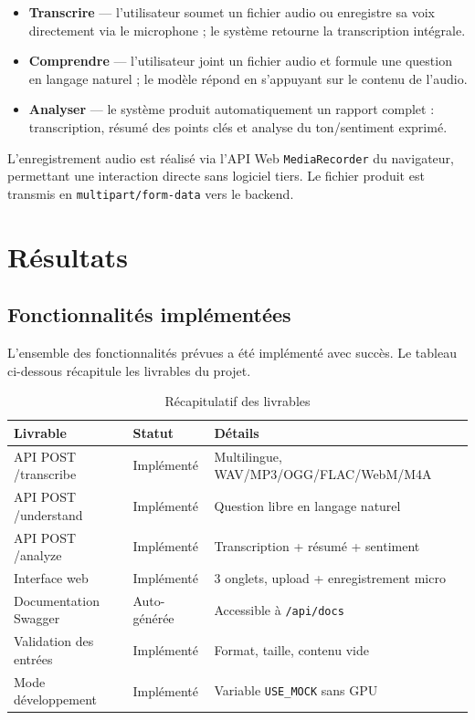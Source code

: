 \documentclass[12pt,a4paper]{report}
\begin{document}
\begin{itemize}
  \item \textbf{Transcrire} --- l'utilisateur soumet un fichier audio ou enregistre sa
        voix directement via le microphone ; le système retourne la transcription intégrale.

  \item \textbf{Comprendre} --- l'utilisateur joint un fichier audio et formule une
        question en langage naturel ; le modèle répond en s'appuyant sur le contenu de
        l'audio.

  \item \textbf{Analyser} --- le système produit automatiquement un rapport complet :
        transcription, résumé des points clés et analyse du ton/sentiment exprimé.
\end{itemize}

L'enregistrement audio est réalisé via l'API Web \texttt{MediaRecorder} du navigateur,
permettant une interaction directe sans logiciel tiers. Le fichier produit est transmis
en \texttt{multipart/form-data} vers le backend.

\chapter{Résultats}

\section{Fonctionnalités implémentées}

L'ensemble des fonctionnalités prévues a été implémenté avec succès. Le tableau
ci-dessous récapitule les livrables du projet.

\begin{table}[h]
\centering
{}
\begin{tabularx}{\textwidth}{llX}
\toprule
\textbf{Livrable} & \textbf{Statut} & \textbf{Détails} \\
\midrule
API POST /transcribe    & Implémenté & Multilingue, WAV/MP3/OGG/FLAC/WebM/M4A \\
API POST /understand    & Implémenté & Question libre en langage naturel \\
API POST /analyze       & Implémenté & Transcription + résumé + sentiment \\
Interface web           & Implémenté & 3 onglets, upload + enregistrement micro \\
Documentation Swagger   & Auto-générée & Accessible à \texttt{/api/docs} \\
Validation des entrées  & Implémenté & Format, taille, contenu vide \\
Mode développement      & Implémenté & Variable \texttt{USE\_MOCK} sans GPU \\
\bottomrule
\end{tabularx}
\caption{Récapitulatif des livrables}
\end{table}
\end{document}
